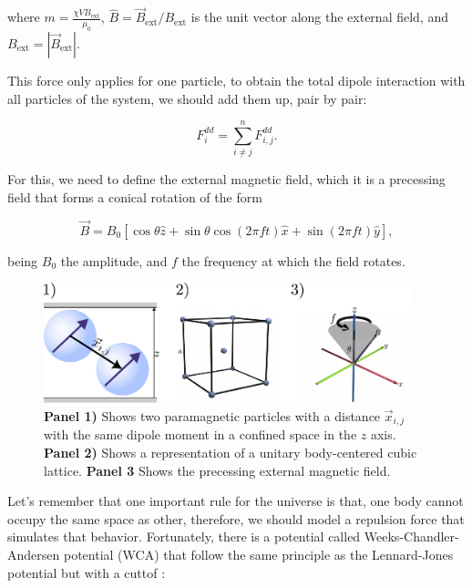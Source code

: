 where $m = \frac{\chi V B_{\text{ext}}}{\mu_0}$, $\hat{B} = \vec{B}_{\text{ext}}/B_{\text{ext}}$ is the unit vector along the external field, and $B_{\text{ext}} = |\vec{B}_{\text{ext}}|$. 

This force only applies for one particle, to obtain the total dipole interaction with all particles of the system, we should add them up, pair by pair:

\begin{equation}
  F^{dd}_i = \sum^{n}_{i \neq j} F^{dd}_{i,j}.  
  \label{eq:dipolesum}
\end{equation}

For this, we need to define the external magnetic field, which it is a precessing field that forms a conical rotation of the form

\begin{equation}
  \vec{B} = B_0 [\cos{\theta}\hat{z} + \sin{\theta}\cos{(2\pi f t)}\hat{x} + \sin{(2\pi f t)}\hat{y}],
  \label{eq:magneticfield}
\end{equation}

being $B_0$ the amplitude, and $f$ the frequency at which the field rotates.


\begin{figure}[H]
  \begin{center}
    \includegraphics[width=0.95\textwidth]{figures/methods1.pdf}
  \end{center}
  \caption{\textbf{Panel 1)} Shows two paramagnetic particles with a distance \(\vec{x}_{i,j}\) with the same dipole moment in a confined space in the \( z\) axis. \textbf{Panel 2)} Shows a representation of a  unitary body-centered cubic lattice. \textbf{Panel 3} Shows the precessing external magnetic field.}\label{fig:facecenteredlattice}
\end{figure}

Let's remember that one important rule for the universe is that, one body cannot occupy the same space as other, therefore, we should model a repulsion force that simulates that behavior. Fortunately, there is a potential called Weeks-Chandler-Andersen potential (WCA) that follow the same principle as the Lennard-Jones potential but with a cuttof \cite{hess1999augmented}:

